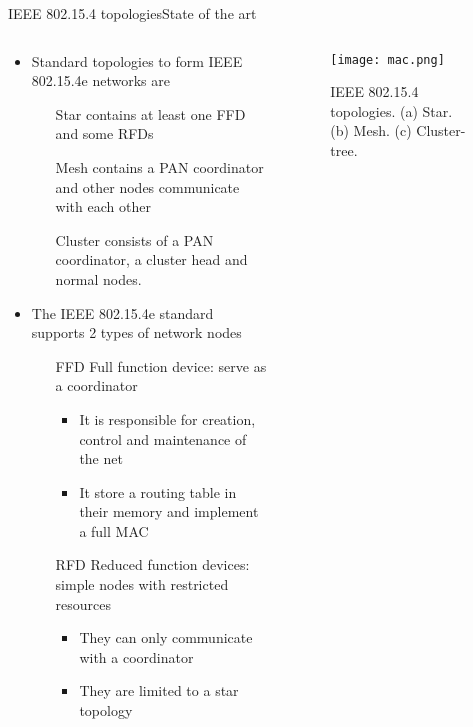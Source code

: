 \begin{frame}{IEEE 802.15.4 topologies}{State of the art}
	\begin{columns}
		
		\begin{column}{0.65\textwidth}
		
			\begin{itemize}
			
				\item Standard topologies to form IEEE 802.15.4e networks are 
					\begin{itemize}
						\item[Star] contains at least one FFD and some RFDs
						\item[Mesh] contains a PAN coordinator and other nodes communicate with each other
						\item[Cluster] consists of a PAN coordinator, a cluster head and normal nodes.
					\end{itemize}
					
				\item The IEEE 802.15.4e standard supports 2 types of network nodes
					\begin{itemize}
						\item[FFD] Full function device: serve as a coordinator
							\begin{itemize}
								\item It is responsible for creation, control and maintenance of the net
								\item It store a routing table in their memory and implement a full MAC
							\end{itemize}
						\item[RFD] Reduced function devices: simple nodes with restricted resources
							\begin{itemize}
								\item They can only communicate with a coordinator
								\item They are limited to a star topology
							\end{itemize}
					\end{itemize}
			\end{itemize}
			
		\end{column}
		
		\begin{column}{0.35\textwidth}
			\begin{center}
			
				\begin{figure}
					\texttt{[image: mac.png]}
					\caption{\label{fig:topologies} IEEE 802.15.4 topologies. (a) Star. (b) Mesh. (c) Cluster-tree.}
				\end{figure}
				
			\end{center}
		\end{column}
		
	\end{columns}
	
\end{frame}

